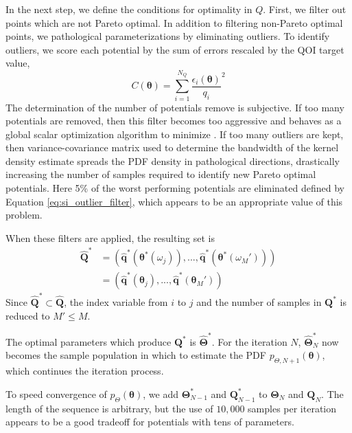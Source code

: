 In the next step, we define the conditions for optimality in $Q$.
First, we filter out points which are not Pareto optimal.  In addition to filtering non-Pareto optimal points, we pathological parameterizations by eliminating outliers.  To identify outliers, we score each potential by the sum of errors rescaled by the QOI target value,
\begin{equation}
  \label{eq:si_outlier_filter}
	C(\bm{\theta}) = \sum_{i=1}^{N_Q}\frac{\epsilon_{i}(\bm{\theta})}
	                                      {q_i}^2
\end{equation}
The determination of the number of potentials remove is subjective.  If too many potentials are removed, then this filter becomes too aggressive and behaves as a global scalar optimization algorithm to minimize \label{eq:si_outlier_filter}.  If too many outliers are kept, then variance-covariance matrix used to determine the bandwidth of the kernel density estimate spreads the PDF density in pathological directions, drastically increasing the number of samples required to identify new Pareto optimal potentials.  Here 5\% of the worst performing potentials are eliminated defined by Equation \ref{eq:si_outlier_filter}, which appears to be an appropriate value of this problem.

When these filters are applied, the resulting set is
\begin{subequations}
  \begin{align}
     \hat{\bm{Q}}^*
       &= (\hat{\bm{q}}^*(\bm{\theta}^*(\omega_j)),
           ...,
           \hat{\bm{q}}^*(\bm{\theta}^*(\omega_M'))
          )
      \label{eq:si_qoistar_seq_1} \\
       &= (\hat{\bm{q}}^*(\bm{\theta}_j),
           ...,
           \hat{\bm{q}}^*(\bm{\theta}_M')
          )
      \label{eq:si_qoistar_seq_2}
  \end{align}
\end{subequations}
Since $\hat{\bm{Q}}^* \subset \hat{\bm{Q}}$, the index variable from $i$ to $j$ and the number of samples in $\bm{Q}^*$ is reduced to $M' \leq M$.

The optimal parameters which produce $\bm{Q}^*$ is $\hat{\bm{\Theta}}^*$.  For the iteration $N$, $\hat{\bm{\Theta}}_{N}^*$ now becomes the sample population in which to estimate the PDF $p_{\Theta,N+1}(\bm{\theta})$, which continues the iteration process.

To speed convergence of $p_{\Theta}(\bm{\theta})$, we add $\bm{\Theta}_{N-1}^*$ and $\bm{Q}_{N-1}^*$ to $\bm{\Theta}_{N}$ and $\bm{Q}_{N}$.  The length of the sequence is arbitrary, but the use of $10,000$ samples per iteration appears to be a good tradeoff for potentials with tens of parameters.

